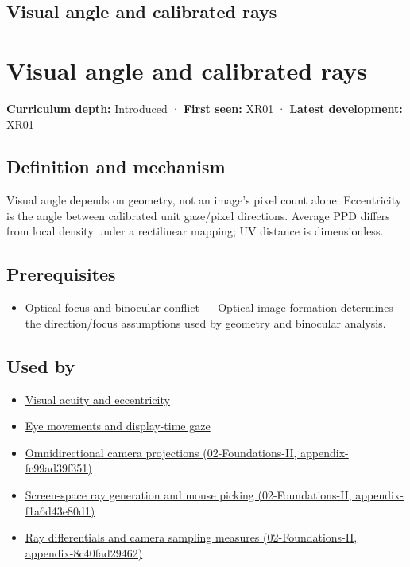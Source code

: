 \hypertarget{appendix-7d356c396d1a}{}
\section*{Visual angle and calibrated rays}
\chapter{Visual angle and calibrated rays}\label{appendix-7d356c396d1a-visual-angle-and-calibrated-rays}

\textbf{Curriculum depth:} Introduced · \textbf{First seen:} XR01 · \textbf{Latest development:} XR01

\section{Definition and mechanism}\label{appendix-7d356c396d1a-definition-and-mechanism}

Visual angle depends on geometry, not an image's pixel count alone. Eccentricity is the angle between calibrated unit gaze/pixel directions. Average PPD differs from local density under a rectilinear mapping; UV distance is dimensionless.

\section{Prerequisites}\label{appendix-7d356c396d1a-prerequisites}

\begin{itemize}
\tightlist
\item
  \hyperref[appendix-f90cee1be7a4]{Optical focus and binocular conflict} --- Optical image formation determines the direction/focus assumptions used by geometry and binocular analysis.
\end{itemize}

\section{Used by}\label{appendix-7d356c396d1a-used-by}

\begin{itemize}
\item
  \hyperref[appendix-b491fc48c54b]{Visual acuity and eccentricity}
\item
  \hyperref[appendix-a6f2c4fe1996]{Eye movements and display-time gaze}
\item
  \href{../02-Foundations-II/main.pdf\#nameddest=appendix-fc99ad39f351}{Omnidirectional camera projections (02-Foundations-II, appendix-fc99ad39f351)}
\item
  \href{../02-Foundations-II/main.pdf\#nameddest=appendix-f1a6d43e80d1}{Screen-space ray generation and mouse picking (02-Foundations-II, appendix-f1a6d43e80d1)}
\item
  \href{../02-Foundations-II/main.pdf\#nameddest=appendix-8c40fad29462}{Ray differentials and camera sampling measures (02-Foundations-II, appendix-8c40fad29462)}
\end{itemize}

